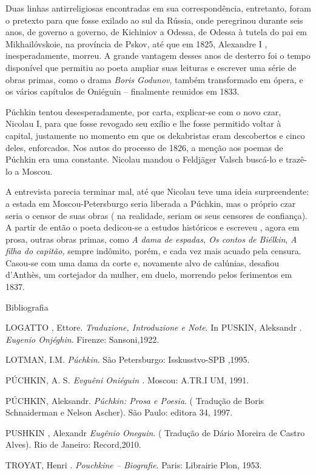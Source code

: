 Duas linhas antirreligiosas encontradas em sua correspondência,
entretanto, foram o pretexto para que fosse exilado ao sul da Rússia,
onde peregrinou durante seis anos, de governo a governo, de Kichiniov a
Odessa, de Odessa à tutela do pai em Mikhailóvskoie, na província de
Pskov, até que em 1825, Alexandre I , inesperadamente, morreu. A grande
vantagem desses anos de desterro foi o tempo disponível que permitiu ao
poeta ampliar suas leituras e escrever uma série de obras primas, como o
drama \emph{Boris Godunov}, também transformado em ópera, e os vários
capítulos de Oniéguin -- finalmente reunidos em 1833.

Púchkin tentou desesperadamente, por carta, explicar-se com o novo czar,
Nicolau I, para que fosse revogado seu exílio e lhe fosse permitido
voltar à capital, justamente no momento em que os dekabristas eram
descobertos e cinco deles, enforcados. Nos autos do processo de 1826, a
menção aos poemas de Púchkin era uma constante. Nicolau mandou o
Feldjäger Valsch buscá-lo e trazê-lo a Moscou.

A entrevista parecia terminar mal, até que Nicolau teve uma ideia
surpreendente: a estada em Moscou-Petersburgo seria liberada a Púchkin,
mas o próprio czar seria o censor de suas obras ( na realidade, seriam
os seus censores de confiança). A partir de então o poeta dedicou-se a
estudos históricos e escreveu , agora em prosa, outras obras primas,
como \emph{A dama de espadas, Os contos de Biélkin}, \emph{A filha do
capitão,} sempre indômito, porém, e cada vez mais acuado pela censura.
Casou-se com uma dama da corte e, novamente alvo de calúnias, desafiou
d'Anthès, um cortejador da mulher, em duelo, morrendo pelos ferimentos
em 1837.

Bibliografia

LOGATTO , Ettore. \emph{Traduzione, Introduzione e Note}. In PUSKIN,
Aleksandr . \emph{Eugenio Onjéghin}. Firenze: Sansoni,1922.

LOTMAN, I.M. \emph{Púchkin}. São Petersburgo: Isskusstvo-SPB ,1995.

PÚCHKIN, A. S\emph{. Evguêni Oniéguin .} Moscou: A.TR.I UM, 1991.

PÚCHKIN, Aleksandr. \emph{Púchkin: Prosa e Poesia}. ( Tradução de Boris
Schnaiderman e Nelson Ascher). São Paulo: editora 34, 1997.

PUSHKIN , Alexandr \emph{Eugênio Oneguin}. ( Tradução de Dário Moreira
de Castro Alves). Rio de Janeiro: Record,2010.

TROYAT, Henri . \emph{Pouchkine -- Biografie}. Paris: Librairie Plon,
1953.

